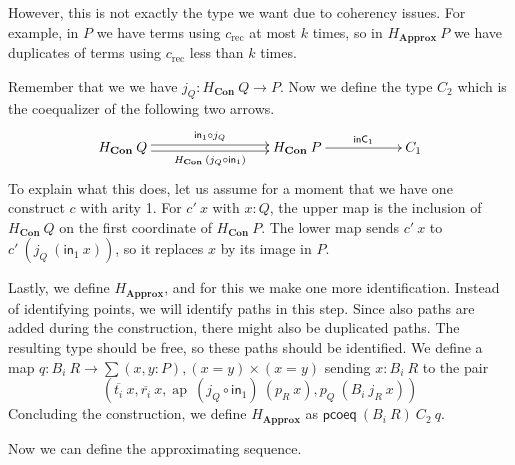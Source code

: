 \documentclass[a4paper,UKenglish]{lipics-v2016}
\newcommand{\Boperator}[1]{\mathsf{#1}}
\newcommand{\inn}{\Boperator{in}}
\newcommand{\rec}[0]{\operatorname{rec}}
\newcommand{\ap}[0]{\operatorname{ap}}
\newcommand{\Con}[0]{\textbf{Con}}
\newcommand{\Approx}[0]{\textbf{Approx}}
\newcommand{\inC}[0]{\Boperator{inC}}
\newcommand{\pcoeq}[0]{\Boperator{pcoeq}}
\begin{document}
However, this is not exactly the type we want due to coherency issues.
For example, in $P$ we have terms using $c_{\rec}$ at most $k$ times, so in $H_{\Approx} \> P$ we have duplicates of terms using $c_{\rec}$ less than $k$ times.

Remember that we we have $j_Q : H_{\Con} \> Q \rightarrow P$.
Now we define the type $C_2$ which is the coequalizer of the following two arrows.
\[
\xymatrix
{
        H_{\Con} \> Q \ar@<-.5ex>[rrr]_-{H_{\Con} \> (j_Q \circ \inn_1)} \ar@<.5ex>[rrr]^-{\inn_1 \circ j_Q} & & & H_{\Con} \> P \ar[rr]^-{\inC_1} & & C_1
}
\]
To explain what this does, let us assume for a moment that we have one construct $c$ with arity 1.
For $c' \> x$ with $x : Q$, the upper map is the inclusion of $H_{\Con} \> Q$ on the first coordinate of $H_{\Con} \> P$.
The lower map sends $c' \> x$ to $c' \> (j_Q \> (\inn_1 \> x))$, so it replaces $x$ by its image in $P$.

Lastly, we define $H_\Approx$, and for this we make one more identification.
Instead of identifying points, we will identify paths in this step.
Since also paths are added during the construction, there might also be duplicated paths.
The resulting type should be free, so these paths should be identified.
We define a map $q : B_i \> R \rightarrow \sum (x, y : P), (x = y) \times (x = y)$ sending $x : B_i \> R$ to the pair
\[
(\overline{t_i} \> x, \overline{r_i} \> x, \ap \> (j_Q \circ \inn_1) \> (p_R \> x), p_Q \> (B_i \> j_R \> x))
\]
Concluding the construction, we define $H_{\Approx}$ as $\pcoeq \> (B_i \> R) \> C_2 \> q$.

Now we can define the approximating sequence.
\end{document}
